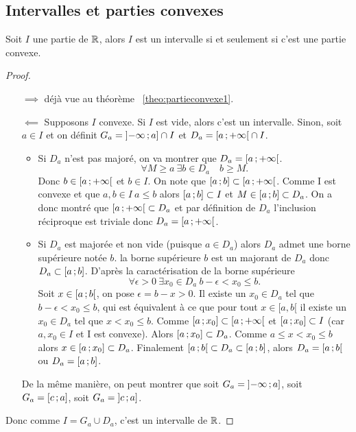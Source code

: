 \subsection{Intervalles et parties convexes}

\begin{theo}
  Soit \(I\) une partie de \(\mathbb{R}\), alors \(I\) est un intervalle si et seulement si c'est une partie convexe.
\end{theo}
\begin{proof}
  \begin{itemize}
  \item[\(\implies\)] déjà vue au théorème~
\ref{theo:partieconvexe1}.
  \item[\(\impliedby\)] Supposons \(I\) convexe. Si \(I\) est vide, alors c'est un intervalle. Sinon, soit \(a\in I\) et on définit \(G_a=\left] -\infty \, ;  a \right]\cap I\) et \(D_a=\left[ a \, ;  +\infty \right[\cap I\).
    \begin{itemize}
    \item Si \(D_a\) n'est pas majoré, on va montrer que \(D_a=\left[ a \, ;  +\infty \right[\).
      \begin{equation}
        \forall M \geqslant a \ \exists b \in D_a \quad b\geqslant M.
      \end{equation}
      Donc \(b\in \left[ a \, ;  +\infty \right[\) et \(b\in I\). On note que \(\left[ a \, ;  b \right]\subset \left[ a \, ;  +\infty \right[\). Comme I est convexe et que \(a,b \in I \ a \leqslant b\) alors \(\left[ a \, ;  b \right]\subset I\) et \(M\in \left[ a \, ;  b \right] \subset D_a\). On a donc montré que \(\left[ a \, ;  +\infty \right[ \subset D_a\) et par définition de \(D_a\) l'inclusion réciproque est triviale donc \(D_a=\left[ a \, ;  +\infty \right[\).
    \item Si \(D_a\) est majorée et non vide (puisque \(a\in D_a\)) alors \(D_a\) admet une borne supérieure notée \(b\). la borne supérieure \(b\) est un majorant de \(D_a\) donc \(D_a \subset \left[ a \, ;  b \right]\). D'après la caractérisation de la borne supérieure
      \begin{equation}
        \forall \epsilon >0 \ \exists x_0 \in D_a \ b-\epsilon < x_0\leqslant b.
      \end{equation}
      Soit \(x\in \left[ a \, ;  b \right[\), on pose \(\epsilon=b-x>0\). Il existe un \(x_0\in D_a\) tel que \(b-\epsilon<x_0 \leqslant b\), qui est équivalent à ce que pour tout \(x\in[a,b[\) il existe un \(x_0\in D_a\) tel que \(x<x_0 \leqslant b\). Comme \(\left[ a \, ;  x_0 \right]\subset \left[ a \, ;  +\infty \right[\) et \(\left[ a \, ;  x_0 \right]\subset I\) (car \(a,x_0 \in I\) et I est convexe). Alors \(\left[ a \, ;  x_0 \right] \subset D_a\). Comme \(a\leqslant x < x_0\leqslant b\) alors \(x\in \left[ a \, ;  x_0 \right]\subset D_a\). Finalement \(\left[ a \, ;  b \right[\subset D_a \subset \left[ a \, ;  b \right]\), alors \(D_a=\left[ a \, ;  b \right[\) ou \(D_a=\left[ a \, ;  b \right]\).
    \end{itemize}
    De la même manière, on peut montrer que soit \(G_a=\left] -\infty \, ;  a \right]\), soit \(G_a=\left[ c \, ;  a \right]\), soit \(G_a=\left] c \, ;  a \right]\).
  \end{itemize}
  Donc comme \(I=G_a\cup D_a\), c'est un intervalle de \(\mathbb{R}\).
\end{proof}

